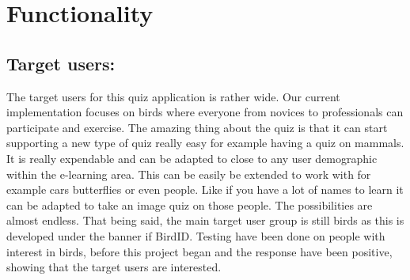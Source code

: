 \chapter{Functionality}
\label{chap:functionality}


\section{Target users:}
\label{sec:targetusers}
The target users for this quiz application is rather wide. Our current implementation focuses on birds where everyone from novices to professionals  can participate and exercise. The amazing thing about the quiz is that it can start supporting a new type of quiz really easy for example having a quiz on mammals. It is really expendable and can be adapted to close to any user demographic within the e-learning area. This can be easily be extended to work with for example cars butterflies or even people. Like if you have a lot of names to learn it can be adapted to take an image quiz on those people. The possibilities are almost endless. That being said, the main target user group is still birds as this is developed under the banner if BirdID. Testing have been done on people with interest in birds, before this project began and the response have been positive, showing that the target users are interested.


